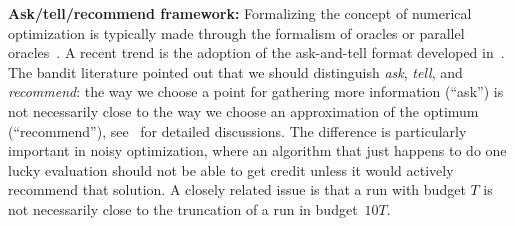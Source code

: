 \textbf{Ask/tell/recommend framework:}   
Formalizing the concept of numerical optimization is typically made through the formalism of oracles or parallel oracles~\cite{oracles}. 
A recent trend is the adoption of the ask-and-tell format developed in~\cite{ath}. 
The bandit literature pointed out that we should distinguish \emph{ask}, \emph{tell}, and \emph{recommend}: the way we choose a point for gathering more information {(``ask'')} is not necessarily close to the way we choose an approximation of the optimum {(``recommend'')}, see~\cite{bubeck,coulomnoise,decocknoise} for detailed discussions. 
{The difference is particularly important in noisy optimization, where an algorithm that just happens to do one lucky evaluation should not be able to get credit unless it would actively recommend that solution. A closely related issue is that a run with budget $T$ is not necessarily close to the truncation of a run in budget~$10T$. }
% 
% 
